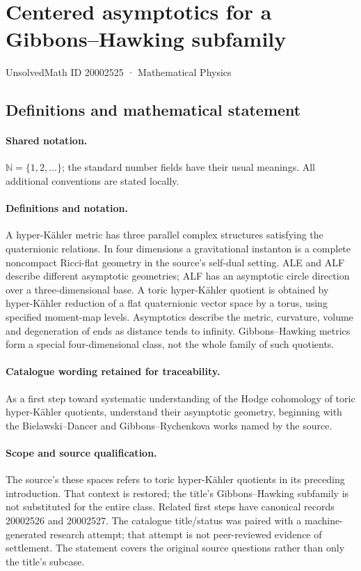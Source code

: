 \documentclass[11pt]{article}
\begin{document}
\setcounter{section}{20002524}
\section{Centered asymptotics for a Gibbons--Hawking subfamily}\label{20002525}
{\small UnsolvedMath ID 20002525 · Mathematical Physics}
\subsection{Definitions and mathematical statement}

\paragraph{Shared notation.}$\mathbb N=\{1,2,\ldots\}$; the standard number fields have their usual meanings. All additional conventions are stated locally.


\paragraph{Definitions and notation.}A hyper-Kähler metric has three parallel complex structures satisfying the quaternionic relations. In four dimensions a gravitational instanton is a complete noncompact Ricci-flat geometry in the source’s self-dual setting. ALE and ALF describe different asymptotic geometries; ALF has an asymptotic circle direction over a three-dimensional base. A toric hyper-Kähler quotient is obtained by hyper-Kähler reduction of a flat quaternionic vector space by a torus, using specified moment-map levels. Asymptotics describe the metric, curvature, volume and degeneration of ends as distance tends to infinity. Gibbons--Hawking metrics form a special four-dimensional class, not the whole family of such quotients.

\paragraph{Catalogue wording retained for traceability.}
As a first step toward systematic understanding of the Hodge cohomology of toric hyper-Kähler quotients, understand their asymptotic geometry, beginning with the Bielawski--Dancer and Gibbons--Rychenkova works named by the source.
\paragraph{Scope and source qualification.}The source’s these spaces refers to toric hyper-Kähler quotients in its preceding introduction. That context is restored; the title’s Gibbons–Hawking subfamily is not substituted for the entire class. Related first steps have canonical records 20002526 and 20002527. The catalogue title/status was paired with a machine-generated research attempt; that attempt is not peer-reviewed evidence of settlement. The statement covers the original source questions rather than only the title’s subcase.
\end{document}
